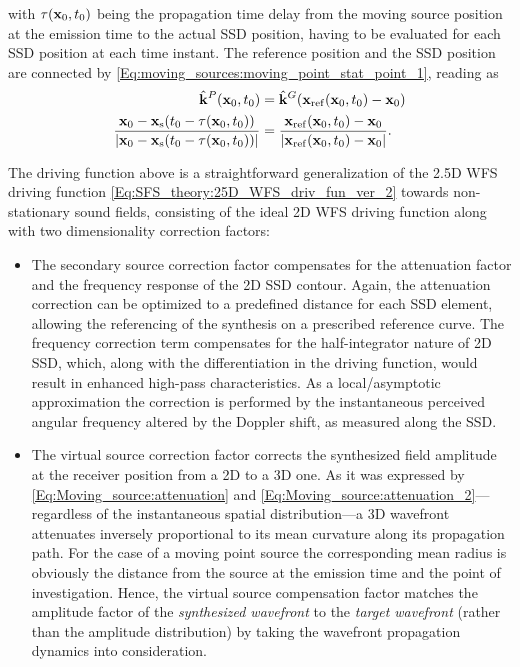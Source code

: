 with $\tau(\mathbf{x}_0,t_0)$ being the propagation time delay from the moving source position at the emission time to the actual SSD position, having to be evaluated for each SSD position at each time instant.
The reference position and the SSD position are connected by \eqref{Eq:moving_sources:moving_point_stat_point_1}, reading as
\begin{align}
\label{Eq:SFS_theory:25D_WFS_ref_point}
\hat{\mathbf{k}}^P(\mathbf{x}_0,t_0) &= \hat{\mathbf{k}}^G(\mathbf{x}_{\mathrm{ref}}(\mathbf{x}_0,t_0)-\mathbf{x}_0)
\\
\frac{\mathbf{x}_0 -\mathbf{x}_{\mathrm{s}}(t_0-\tau(\mathbf{x}_0,t_0))}{|\mathbf{x}_0-\mathbf{x}_{\mathrm{s}}(t_0 - \tau(\mathbf{x}_0,t_0))|} &=  \frac{\mathbf{x}_{\mathrm{ref}}(\mathbf{x}_0,t_0)-\mathbf{x}_0}{|\mathbf{x}_{\mathrm{ref}}(\mathbf{x}_0,t_0)-\mathbf{x}_0|}.
\end{align}

The driving function above is a straightforward generalization of the 2.5D WFS driving function \eqref{Eq:SFS_theory:25D_WFS_driv_fun_ver_2} towards non-stationary sound fields, consisting of the ideal 2D WFS driving function along with two dimensionality correction factors:
\begin{itemize}
\item The secondary source correction factor compensates for the attenuation factor and the frequency response of the 2D SSD contour.
Again, the attenuation correction can be optimized to a predefined distance for each SSD element, allowing the referencing of the synthesis on a prescribed reference curve.
The frequency correction term compensates for the half-integrator nature of 2D SSD, which, along with the differentiation in the driving function, would result in enhanced high-pass characteristics.
As a local/asymptotic approximation the correction is performed by the instantaneous perceived angular frequency altered by the Doppler shift, as measured along the SSD.
\item The virtual source correction factor corrects the synthesized field amplitude at the receiver position from a 2D to a 3D one.
As it was expressed by \eqref{Eq:Moving_source:attenuation} and \eqref{Eq:Moving_source:attenuation_2}---regardless of the instantaneous spatial distribution---a 3D wavefront attenuates inversely proportional to its mean curvature along its propagation path.
For the case of a moving point source the corresponding mean radius is obviously the distance from the source at the emission time and the point of investigation.
Hence, the virtual source compensation factor matches the amplitude factor of the \emph{synthesized wavefront} to the \emph{target wavefront} (rather than the amplitude distribution) by taking the wavefront propagation dynamics into consideration.
\end{itemize}
